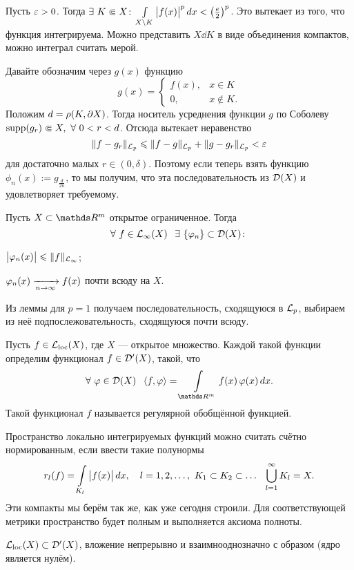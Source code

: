 \begin{Proof}
	Пусть $\varepsilon>0$. Тогда $\exists\ K\Subset X\colon \int\limits_{X\setminus K}\big|f(x)\big|^p\,dx<\left(\frac e2\right)^p$. Это вытекает из того, что функция интегрируема. Можно представить $X\dd K$ в виде объединения компактов, можно интеграл считать мерой.

	Давайте обозначим через $g(x)$ функцию
	\[
  g(x) = \begin{cases}
	  f(x),&x\in K\\
	  0,&x\not\in K.
  \end{cases}
	\]
	Положим $d = \rho(K,\partial X)$. Тогда носитель усреднения функции $g$ по Соболеву $\supp(g_r)\Subset X,\ \forall\ 0<r<d$. Отсюда вытекает неравенство
	\[
  \|f-g_r\|_{\mathcal L_p}\leqslant \|f-g\|_{\mathcal L_p}+\|g-g_r\|_{\mathcal L_p}<\varepsilon
	\]
	для достаточно малых $r\in(0,\delta)$. Поэтому если теперь взять функцию $\phi_n(x) := g_{\frac d{2n}}$, то мы получим, что эта последовательность из $\mathcal D(X)$ и удовлетворяет требуемому.
\end{Proof}
\begin{Sl}
	Пусть $X\subset \R^m$ открытое ограниченное. Тогда
	\[
	\forall\ f\in \L_\infty(X)\pau \exists\ \{\phi_n\}\subset \D(X)\colon
	\]
	\begin{azItems}
	\item $\big|\varphi_n(x)\big|\leqslant \|f\|_{\mathcal L_\infty}$;
	\item $\varphi_n(x)\xrightarrow[n\rightarrow\infty]{} f(x)$ почти всюду на $X$.
	\end{azItems}
\end{Sl}
\begin{Proof}
	Из леммы для $p=1$ получаем последовательность, сходящуюся в $\mathcal L_p$, выбираем из неё подпослежовательность, сходящуюся почти всюду.
\end{Proof}
\begin{Def}
	Пусть $f\in\mathcal L_{\mathrm{loc}}(X)$, где $X$ --- открытое множество. Каждой такой функции определим функционал $f\in\mathcal D'(X)$, такой, что
	\[
	  \forall\ \phi\in\D(X)\pau \la f,\phi\ra = \Gint{\R^m}f(x)\,\phi(x)\,dx.
	\]
	Такой функционал $f$ называется регулярной обобщённой функцией.
\end{Def}
Пространство локально интегрируемых функций можно считать счётно нормированным, если ввести такие полунормы
\[
  r_l(f) = \int\limits_{K_l}\big|f(x)\big|\,dx,\quad l=1,2,\dots,\ K_1\subset K_2\subset\dots\hskip .75em plus.1em minus.08em\relax \bigcup\limits_{l=1}^\infty K_l=X.
\]
Эти компакты мы берём так же, как уже сегодня строили. Для соответствующей метрики пространство будет полным и выполняется аксиома полноты.
\begin{The}[о вложении]
  $\mathcal L_{\mathrm{loc}}(X)\subset \mathcal D'(X)$, вложение непрерывно и взаимнооднозначно с образом (ядро является нулём).
\end{The}
